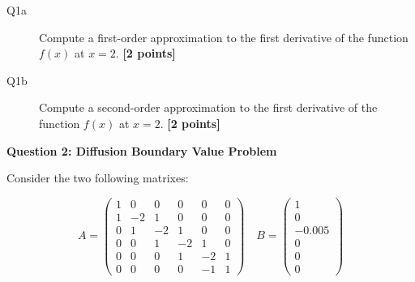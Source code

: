 \documentclass{article}
\begin{document}
\begin{description}
\item [Q1a] Compute a first-order approximation to the first derivative of the function $f(x)$ at $x = 2$.  \textbf{[2 points]}
\vspace{3cm}
\item [Q1b] Compute a second-order approximation to the first derivative of the function $f(x)$ at $x = 2$.  \textbf{[2 points]}
\vspace{3.5cm}

\end{description}




\textbf{Question 2: Diffusion Boundary Value Problem}

Consider the two following matrixes:

\begin{equation}
A = \left( \begin{array}{cccccc}
    1 & 0 & 0 & 0 & 0 & 0 \\
    1 & -2 & 1 & 0 & 0 & 0 \\
    0 & 1 & -2 & 1  & 0 & 0 \\
    0 & 0 & 1 & -2 & 1  & 0 \\
    0 & 0 & 0 & 1 & -2 & 1  \\
    0 & 0 & 0 & 0 & -1 & 1 
\end{array}
\right) \quad B = \left( \begin{array}{c}
    1  \\
    0 \\
    -0.005 \\
    0  \\
    0  \\
    0  
\end{array} \right)
\end{equation} 
\end{document}
